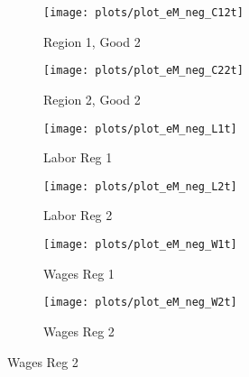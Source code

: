 \documentclass[../thesis.tex]{subfiles}
\begin{document}
\begin{figure}[h!]
	\centering
	\caption{Negative-Monetary-Shock Impulse Response Functions, part 2}
	\begin{subfigure}[b]{0.27\textwidth}
		\centering
		\texttt{[image: plots/plot\_eM\_neg\_C12t]}
		\caption{\scriptsize Region 1, Good 2}
		\label{fig:eM-neg-C12t}
	\end{subfigure}
	\hspace*{0.5cm}
	\begin{subfigure}[b]{0.27\textwidth}
		\centering
		\texttt{[image: plots/plot\_eM\_neg\_C22t]}
		\caption{\scriptsize Region 2, Good 2}
		\label{fig:eM-neg-C22t}
	\end{subfigure}
	\hspace*{0.5cm}
	\begin{subfigure}[b]{0.27\textwidth}
		\centering
		\texttt{[image: plots/plot\_eM\_neg\_L1t]}
		\caption{\scriptsize Labor Reg 1}
		\label{fig:eM-neg-L1t}
	\end{subfigure}
	\vspace*{0.1cm}
	\begin{subfigure}[b]{0.27\textwidth}
		\centering
		\texttt{[image: plots/plot\_eM\_neg\_L2t]}
		\caption{\scriptsize Labor Reg 2}
		\label{fig:eM-neg-L2t}
	\end{subfigure}
	\hspace*{0.5cm}
	\begin{subfigure}[b]{0.27\textwidth}
		\centering
		\texttt{[image: plots/plot\_eM\_neg\_W1t]}
		\caption{\scriptsize Wages Reg 1}
		\label{fig:eM-neg-W1t}
	\end{subfigure}
	\hspace*{0.5cm}
	\begin{subfigure}[b]{0.27\textwidth}
		\centering
		\texttt{[image: plots/plot\_eM\_neg\_W2t]}
		\caption{\scriptsize Wages Reg 2}
		\label{fig:eM-neg-W2t}
	\end{subfigure}
	\vspace*{0.1cm}

\end{figure}
\end{document}

